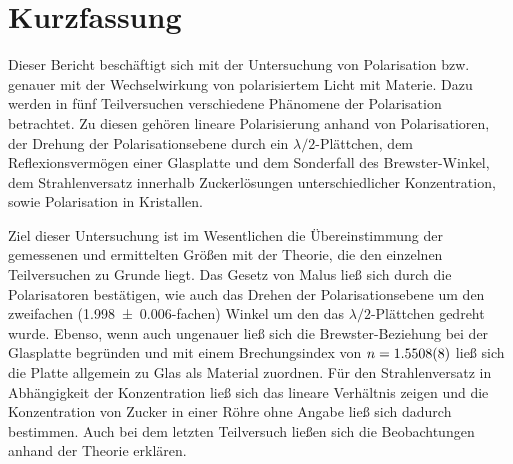 \section{Kurzfassung}

	Dieser Bericht beschäftigt sich mit der Untersuchung von Polarisation bzw. genauer mit der Wechselwirkung von polarisiertem Licht mit Materie.
	Dazu werden in fünf Teilversuchen verschiedene Phänomene der Polarisation betrachtet.
	Zu diesen gehören lineare Polarisierung anhand von Polarisatioren, der Drehung der Polarisationsebene durch ein $\lambda/2$-Plättchen, dem Reflexionsvermögen einer Glasplatte und dem Sonderfall des Brewster-Winkel, dem Strahlenversatz innerhalb Zuckerlösungen unterschiedlicher Konzentration, sowie Polarisation in Kristallen.
	
	Ziel dieser Untersuchung ist im Wesentlichen die Übereinstimmung der gemessenen und ermittelten Größen mit der Theorie, die den einzelnen Teilversuchen zu Grunde liegt.
	Das Gesetz von Malus ließ sich durch die Polarisatoren bestätigen, wie auch das Drehen der Polarisationsebene um den zweifachen (\SI{1,998+-0,006}{}-fachen) Winkel um den das $\lambda/2$-Plättchen gedreht wurde.
	Ebenso, wenn auch ungenauer ließ sich die Brewster-Beziehung bei der Glasplatte begründen und mit einem Brechungsindex von $n = \SI{1,5508+-0,0008}{}$ ließ sich die Platte allgemein zu Glas als Material zuordnen.
	Für den Strahlenversatz in Abhängigkeit der Konzentration ließ sich das lineare Verhältnis zeigen und die Konzentration von Zucker in einer Röhre ohne Angabe ließ sich dadurch bestimmen.
	Auch bei dem letzten Teilversuch ließen sich die Beobachtungen anhand der Theorie erklären. 
	